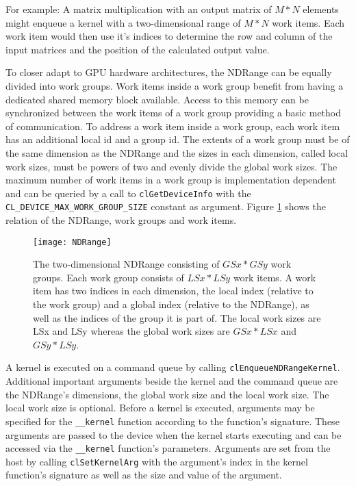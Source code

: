 For example: A matrix multiplication with an output matrix of $M * N$ elements might enqueue a kernel with a two-dimensional range of $M * N$ work items. Each work item would then use it's indices to determine the row and column of the input matrices and the position of the calculated output value.

To closer adapt to GPU hardware architectures, the NDRange can be equally divided into work groups. Work items inside a work group benefit from having a dedicated shared memory block available. Access to this memory can be synchronized between the work items of a work group providing a basic method of communication. To address a work item inside a work group, each work item has an additional local id and a group id. The extents of a work group must be of the same dimension as the NDRange and the sizes in each dimension, called local work sizes, must be powers of two and evenly divide the global work sizes. \cite[p.18]{opencl_book} The maximum number of work items in a work group is implementation dependent and can be queried by a call to \lstinline!clGetDeviceInfo! with the \lstinline!CL_DEVICE_MAX_WORK_GROUP_SIZE! constant as argument. Figure \ref{fig:NDRange} shows the relation of the NDRange, work groups and work items. 

\begin{figure}[h]
\centering
\texttt{[image: NDRange]}
\caption{The two-dimensional NDRange consisting of $GSx * GSy$ work groups. Each work group consists of $LSx * LSy$ work items. A work item has two indices in each dimension, the local index (relative to the work group) and a global index (relative to the NDRange), as well as the indices of the group it is part of. The local work sizes are LSx and LSy whereas the global work sizes are $GSx * LSx$ and $GSy * LSy$.}
\label{fig:NDRange}
\end{figure}

A kernel is executed on a command queue by calling \lstinline!clEnqueueNDRangeKernel!. Additional important arguments beside the kernel and the command queue are the NDRange's dimensions, the global work size and the local work size. The local work size is optional. Before a kernel is executed, arguments may be specified for the \lstinline!__kernel! function according to the function's signature. These arguments are passed to the device when the kernel starts executing and can be accessed via the \lstinline!__kernel! function's parameters. Arguments are set from the host by calling \lstinline!clSetKernelArg! with the argument's index in the kernel function's signature as well as the size and value of the argument.

